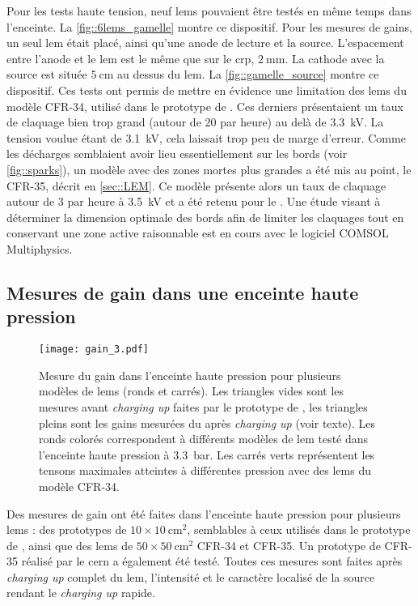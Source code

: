       Pour les tests haute tension, neuf \glspl{lem} pouvaient être testés en même temps dans l'enceinte. La \autoref{fig::6lems_gamelle} montre  ce dispositif. Pour les mesures de gains, un seul \gls{lem} était placé, ainsi qu'une anode de lecture et la source. L'espacement entre l'anode et le \gls{lem} est le même que sur le \gls{crp}, $\SI{2}{\milli\meter}$. La cathode avec la source est située $\SI{5}{\centi\meter}$ au dessus du \gls{lem}. La \autoref{fig::gamelle_source} montre ce dispositif. Ces tests ont permis de mettre en évidence une limitation des \glspl{lem} du modèle CFR-34, utilisé dans le prototype de \TOO{}. Ces derniers présentaient un taux de claquage bien trop grand (autour de 20 par heure) au delà de \SI{3.3}{\kilo\volt}. La tension voulue étant de \SI{3.1}{\kilo\volt}, cela laissait trop peu de marge d'erreur. Comme les décharges semblaient avoir lieu essentiellement sur les bords (voir \autoref{fig::sparks}), un modèle avec des zones mortes plus grandes a été mis au point, le CFR-35, décrit en \autoref{sec::LEM}. Ce modèle présente alors un taux de claquage autour de 3 par heure à \SI{3.5}{\kilo\volt} et a été retenu pour le \SSS{}. Une étude visant à déterminer la dimension optimale des bords afin de limiter les claquages tout en conservant une zone active raisonnable est en cours avec le logiciel COMSOL Multiphysics.

    \subsection{Mesures de gain dans une enceinte haute pression}\label{sec::test_gain}

      \begin{figure}[!htb]
        \texttt{[image: gain\_3.pdf]}
        \caption[Mesure du gain dans l'enceinte haute pression]{\label{fig::gain_gamelle}Mesure du gain dans l'enceinte haute pression pour plusieurs modèles de \glspl{lem} (ronds et carrés). Les triangles vides sont les mesures avant \textit{charging up} faites par le prototype de \threeL{}\cite{Cantini2014}, les triangles pleins sont les gains mesurées du \threeL{} après \textit{charging up} (voir texte). Les ronds colorés correspondent à différents modèles de \gls{lem} testé dans l'enceinte haute pression à \SI{3.3}{\bar}. Les carrés verts représentent les tensons maximales atteintes à différentes pression avec des \glspl{lem} du modèle CFR-34.}
      \end{figure}

      Des mesures de gain ont été faites dans l'enceinte haute pression pour plusieurs \glspl{lem} : des prototypes de $10\times\SI{10}{\centi\meter\squared}$, semblables à ceux utilisés dans le prototype de \threeL{}, ainsi que des \glspl{lem} de $50\times\SI{50}{\centi\meter\squared}$ CFR-34 et CFR-35. Un prototype de CFR-35 réalisé par le \gls{cern} a également été testé. Toutes ces mesures sont faites après \textit{charging up} complet du \gls{lem}, l'intensité et le caractère localisé de la source rendant le \textit{charging up} rapide.

